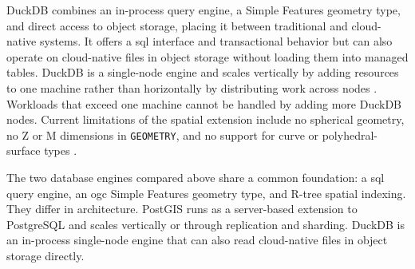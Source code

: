 DuckDB combines an in-process query engine, a Simple Features geometry type, and direct access to object storage, placing it between traditional and cloud-native systems. It offers a \acrshort{sql} interface and transactional behavior but can also operate on cloud-native files in object storage without loading them into managed tables. DuckDB is a single-node engine and scales vertically by adding resources to one machine rather than horizontally by distributing work across nodes \parencite{duckdb2025_scalability_faq}. Workloads that exceed one machine cannot be handled by adding more DuckDB nodes. Current limitations of the spatial extension include no spherical geometry, no Z or M dimensions in \texttt{GEOMETRY}, and no support for curve or polyhedral-surface types \parencite{gabrielsson2023_postgeese_duckdb_spatial_extension, duckdb2025_spatial_extension_overview}.

The two database engines compared above share a common foundation: a \acrshort{sql} query engine, an \acrshort{ogc} Simple Features geometry type, and R-tree spatial indexing. They differ in architecture. PostGIS runs as a server-based extension to PostgreSQL and scales vertically or through replication and sharding. DuckDB is an in-process single-node engine that can also read cloud-native files in object storage directly.


